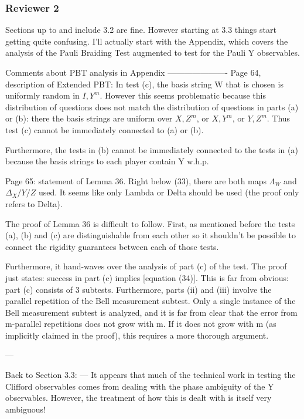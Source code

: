 \documentclass[12pt]{article}
\begin{document}
\subsubsection*{Reviewer 2}

Sections up to and include 3.2 are fine. However starting at 3.3 things start getting quite confusing. I'll actually start with the Appendix, which covers the analysis of the Pauli Braiding Test augmented to test for the Pauli Y observables.

Comments about PBT analysis in Appendix
----------------------
Page 64, description of Extended PBT: In test (c), the basis string W that is chosen is uniformly random in ${I, Y}^m$. However this seems problematic because this distribution of questions does not match the distribution of questions in parts (a) or (b): there the basis strings are uniform over ${X,Z}^m$, or ${X,Y}^m$, or ${Y,Z}^m$. Thus test (c) cannot be immediately connected to (a) or (b).

Furthermore, the tests in (b) cannot be immediately connected to the tests in (a) because the basis strings to each player contain Y w.h.p.

Page 65: statement of Lemma 36. Right below (33), there are both maps $\Lambda_W$ and $\Delta_X/Y/Z$ used. It seems like only Lambda or Delta should be used (the proof only refers to Delta).

The proof of Lemma 36 is difficult to follow. First, as mentioned before the tests (a), (b) and (c) are distinguishable from each other so it shouldn't be possible to connect the rigidity guarantees between each of those tests.

Furthermore,  it hand-waves over the analysis of part (c) of the test. The proof just states: success in part (c) implies [equation (34)]. This is far from obvious: part (c) consists of 3 subtests. Furthermore, parts (ii) and (iii) involve the parallel repetition of the Bell measurement subtest. Only a single instance of the Bell measurement subtest is analyzed, and it is far from clear that the error from m-parallel repetitions does not grow with m.  If it does not grow with m (as implicitly claimed in the proof), this requires a more thorough argument.

---


Back to Section 3.3:
---
It appears that much of the technical work in testing the Clifford observables comes from dealing with the phase ambiguity of the Y observables. However, the treatment of how this is dealt with is itself very ambiguous!
\end{document}
